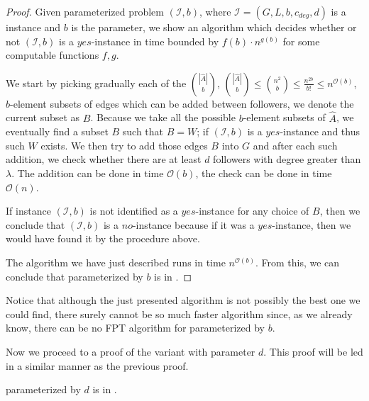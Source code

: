 \begin{proof}
    Given parameterized problem $(\mathcal{I}, b)$, where $\mathcal{I} = (G, L, b, c_{deg}, d)$ is a \HLdeg instance
    and $b$ is the parameter,
    we show an algorithm which decides whether or not $(\mathcal{I}, b)$ is a $yes$-instance in time bounded by
    $f(b) \cdot n^{g(b)}$ for some computable functions $f,g$.

    We start by picking gradually each of the $\binom{|\hat{A}|}{b}$,
    $\binom{|\hat{A}|}{b} \leq \binom{n^2}{b} \leq \frac{n^{2b}}{b!} \leq n^{\mathcal{O}(b)}$,
    $b$-element subsets of edges which can be added between followers, we denote the current subset as $B$.
    Because we take all the possible $b$-element subsets of $\hat{A}$,
    we eventually find a subset $B$ such that $B = W$;
    if $(\mathcal{I}, b)$ is a $yes$-instance and thus such $W$ exists.
    We then try to add those edges $B$ into $G$ and after each such addition,
    we check whether there are at least $d$ followers
    with degree greater than $\lambda$.
    The addition can be done in time $\mathcal{O}(b)$, the check can be done in time $\mathcal{O}(n)$.

    If instance $(\mathcal{I}, b)$ is not identified as a $yes$-instance for any choice of $B$,
    then we conclude that $(\mathcal{I}, b)$ is a $no$-instance because if it was a $yes$-instance,
    then we would have found it by the procedure above.

    The algorithm we have just described runs in time $n^{\mathcal{O}(b)}$.
    From this, we can conclude that \HL parameterized by $b$ is in \XP.
\end{proof}

Notice that although the just presented algorithm is not possibly the best one we could find,
there surely cannot be so much faster algorithm since, as we already know,
there can be no FPT algorithm for \HL parameterized by $b$.


Now we proceed to a proof of the variant with parameter $d$.
This proof will be led in a similar manner as the previous proof.

\begin{theorem}\label{theorem:D:XP}
    \HL parameterized by $d$ is in \XP.
\end{theorem}

